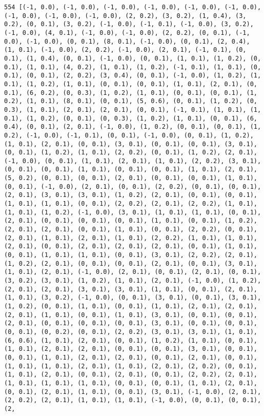 \documentclass[11pt]{article}
\begin{document}
\begin{Verbatim}[commandchars=\\\{\}]
554 [(-1, 0.0), (-1, 0.0), (-1, 0.0), (-1, 0.0), (-1, 0.0), (-1, 0.0), (-1, 0.0), (-1, 0.0), (-1, 0.0), (2, 0.2), (3, 0.2), (1, 0.4), (3, 0.2), (0, 0.1), (3, 0.2), (-1, 0.0), (-1, 0.1), (-1, 0.0), (3, 0.2), (-1, 0.0), (4, 0.1), (-1, 0.0), (-1, 0.0), (2, 0.2), (0, 0.1), (-1, 0.0), (-1, 0.0), (0, 0.1), (8, 0.1), (-1, 0.0), (0, 0.1), (2, 0.4), (1, 0.1), (-1, 0.0), (2, 0.2), (-1, 0.0), (2, 0.1), (-1, 0.1), (0, 0.1), (1, 0.4), (0, 0.1), (-1, 0.0), (0, 0.1), (1, 0.1), (1, 0.2), (0, 0.1), (1, 0.1), (4, 0.2), (1, 0.1), (1, 0.2), (-1, 0.1), (1, 0.1), (0, 0.1), (0, 0.1), (2, 0.2), (3, 0.4), (0, 0.1), (-1, 0.0), (1, 0.2), (1, 0.1), (1, 0.2), (1, 0.1), (0, 0.1), (0, 0.1), (1, 0.1), (2, 0.1), (0, 0.1), (6, 0.2), (0, 0.3), (1, 0.2), (1, 0.1), (0, 0.1), (0, 0.1), (1, 0.2), (1, 0.1), (8, 0.1), (0, 0.1), (5, 0.6), (0, 0.1), (1, 0.2), (0, 0.3), (1, 0.1), (2, 0.1), (2, 0.1), (0, 0.1), (-1, 0.1), (1, 0.1), (1, 0.1), (1, 0.2), (0, 0.1), (0, 0.3), (1, 0.2), (1, 0.1), (0, 0.1), (6, 0.4), (0, 0.1), (2, 0.1), (-1, 0.0), (1, 0.2), (0, 0.1), (0, 0.1), (1, 0.2), (-1, 0.0), (-1, 0.1), (0, 0.1), (-1, 0.0), (0, 0.1), (1, 0.2), (1, 0.1), (2, 0.1), (0, 0.1), (3, 0.1), (0, 0.1), (0, 0.1), (3, 0.1), (0, 0.1), (1, 0.2), (1, 0.1), (2, 0.2), (0, 0.1), (1, 0.2), (2, 0.1), (-1, 0.0), (0, 0.1), (1, 0.1), (2, 0.1), (1, 0.1), (2, 0.2), (3, 0.1), (0, 0.1), (0, 0.1), (1, 0.1), (0, 0.1), (0, 0.1), (1, 0.1), (2, 0.1), (5, 0.2), (0, 0.1), (0, 0.1), (2, 0.1), (0, 0.1), (0, 0.1), (1, 0.1), (0, 0.1), (-1, 0.0), (2, 0.1), (0, 0.1), (2, 0.2), (0, 0.1), (0, 0.1), (2, 0.1), (3, 0.1), (3, 0.1), (1, 0.2), (2, 0.1), (0, 0.1), (0, 0.1), (1, 0.1), (1, 0.1), (0, 0.1), (2, 0.2), (2, 0.1), (2, 0.2), (1, 0.1), (1, 0.1), (1, 0.2), (-1, 0.0), (3, 0.1), (1, 0.1), (1, 0.1), (0, 0.1), (2, 0.1), (0, 0.1), (0, 0.1), (0, 0.1), (1, 0.1), (0, 0.1), (1, 0.2), (2, 0.1), (2, 0.1), (0, 0.1), (1, 0.1), (0, 0.1), (2, 0.2), (0, 0.1), (2, 0.1), (1, 0.1), (2, 0.1), (1, 0.1), (2, 0.2), (1, 0.1), (1, 0.1), (2, 0.1), (0, 0.1), (2, 0.1), (2, 0.1), (2, 0.1), (0, 0.1), (1, 0.1), (0, 0.1), (1, 0.1), (1, 0.1), (0, 0.1), (3, 0.1), (2, 0.2), (2, 0.1), (1, 0.2), (2, 0.1), (0, 0.1), (0, 0.1), (2, 0.1), (0, 0.1), (3, 0.1), (1, 0.1), (2, 0.1), (-1, 0.0), (2, 0.1), (0, 0.1), (2, 0.1), (0, 0.1), (3, 0.2), (3, 0.1), (1, 0.2), (1, 0.1), (2, 0.1), (-1, 0.0), (1, 0.2), (2, 0.1), (2, 0.1), (3, 0.1), (3, 0.1), (1, 0.1), (0, 0.1), (2, 0.1), (1, 0.1), (3, 0.2), (-1, 0.0), (0, 0.1), (3, 0.1), (0, 0.1), (3, 0.1), (1, 0.2), (0, 0.1), (1, 0.1), (0, 0.1), (1, 0.1), (2, 0.1), (2, 0.1), (2, 0.1), (1, 0.1), (0, 0.1), (1, 0.1), (3, 0.1), (0, 0.1), (0, 0.1), (2, 0.1), (0, 0.1), (0, 0.1), (0, 0.1), (3, 0.1), (0, 0.1), (0, 0.1), (0, 0.1), (0, 0.2), (0, 0.1), (2, 0.2), (3, 0.1), (3, 0.1), (1, 0.1), (6, 0.6), (1, 0.1), (2, 0.1), (0, 0.1), (1, 0.2), (1, 0.1), (0, 0.1), (1, 0.1), (2, 0.1), (2, 0.1), (0, 0.1), (0, 0.1), (3, 0.1), (0, 0.1), (0, 0.1), (1, 0.1), (2, 0.1), (2, 0.1), (0, 0.1), (2, 0.1), (0, 0.1), (1, 0.1), (1, 0.1), (2, 0.1), (1, 0.1), (2, 0.1), (2, 0.2), (0, 0.1), (1, 0.1), (2, 0.1), (0, 0.1), (2, 0.1), (0, 0.1), (2, 0.2), (2, 0.1), (1, 0.1), (1, 0.1), (1, 0.1), (0, 0.1), (0, 0.1), (1, 0.1), (2, 0.1), (0, 0.1), (2, 0.1), (1, 0.1), (0, 0.1), (3, 0.1), (-1, 0.0), (2, 0.1), (2, 0.2), (2, 0.1), (1, 0.1), (1, 0.1), (-1, 0.0), (0, 0.1), (0, 0.1), (2, 
\end{Verbatim}
\end{document}
